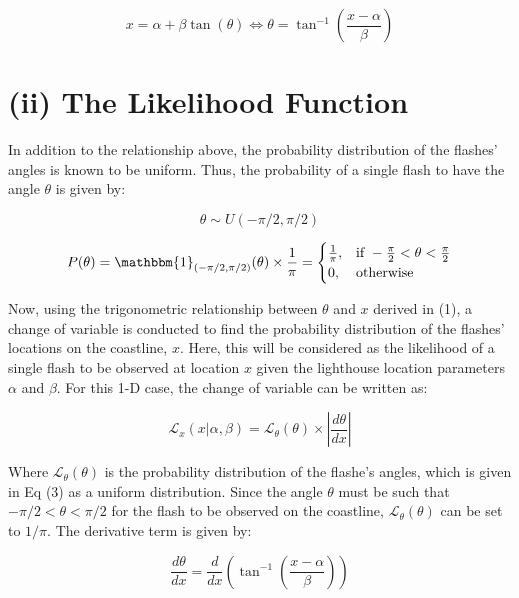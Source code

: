 \documentclass[12pt]{report} %
\begin{document}
\begin{equation}
    x = \alpha + \beta \tan(\theta) \iff \theta = \tan^{-1}\left(\frac{x - \alpha}{\beta}\right)
\end{equation}

\section*{(ii) The Likelihood Function}

In addition to the relationship above, the probability distribution of the flashes' angles is known to be uniform. Thus, the probability of a single flash to have the angle $\theta$ is given by:

\begin{equation}
    \theta \sim U(-\pi/2, \pi/2)
\end{equation}

\begin{equation}
    P(\theta) = \mathbbm{1}_{(-\pi/2, \pi/2)}(\theta) \times \frac{1}{\pi} = \begin{cases} \frac{1}{\pi}, & \text{if } -\frac{\pi}{2} < \theta < \frac{\pi}{2} \\ 0, & \text{otherwise} \end{cases}
\end{equation}

Now, using the trigonometric relationship between $\theta$ and $x$ derived in (1), a change of variable is conducted to find the probability distribution of the flashes' locations on the coastline, $x$. Here, this will be considered as the likelihood of a single flash to be observed at location $x$ given the lighthouse location parameters $\alpha$ and $\beta$. For this 1-D case, the change of variable can be written as:

\begin{equation}
    \mathcal{L}_{x}(x|\alpha, \beta) = \mathcal{L}_{\theta}(\theta) \times \left| \frac{d\theta}{dx} \right|
\end{equation}

Where $\mathcal{L}_{\theta}(\theta)$ is the probability distribution of the flashe's angles, which is given in Eq (3) as a uniform distribution. Since the angle $\theta$ must be such that $-\pi/2 < \theta < \pi/2$ for the flash to be observed on the coastline, $\mathcal{L}_{\theta}(\theta)$ can be set to $1/\pi$. The derivative term is given by:

\begin{equation}
    \frac{d\theta}{dx} = \frac{d}{dx} (\tan^{-1}\left(\frac{x - \alpha}{\beta}\right) )
\end{equation}
\end{document}
